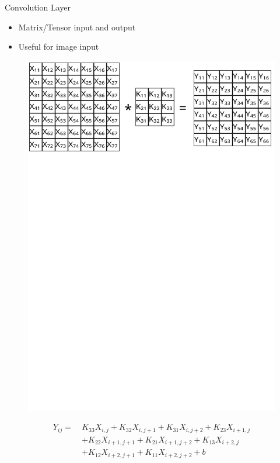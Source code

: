 \documentclass{beamer}
\begin{document}
\begin{frame}{Convolution Layer}
    \begin{itemize}
        \item Matrix/Tensor input and output
        \item Useful for image input
    \end{itemize}

    \begin{figure}
        \includegraphics[width=\textwidth]{conv}
    \end{figure}

    \vspace{-10pt}
    \begin{align*}
        Y_{ij} =\ & K_{33}X_{i,j} + K_{32}X_{i,j+1} + K_{31}X_{i,j+2} + K_{23}X_{i+1,j} \\
               &  + K_{22}X_{i+1,j+1} + K_{21}X_{i+1,j+2} + K_{13}X_{i+2,j} \\
               & + K_{12}X_{i+2,j+1} + K_{11}X_{i+2,j+2} + b
    \end{align*}
\end{frame}
\end{document}
